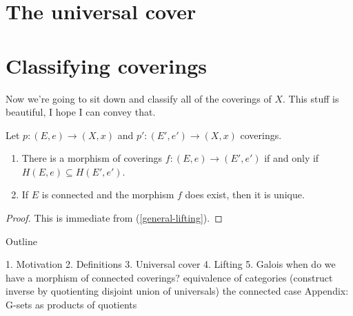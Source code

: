 \section{The universal cover}


\section{Classifying coverings}

Now we're going to sit down and classify all of the coverings of
$X$. This stuff is beautiful, I hope I can convey that.

\begin{lemma}
  Let $p : (E,e) \to (X,x)$ and $p' : (E',e') \to (X,x)$
  coverings.
  \begin{enumerate}
  \item There is a morphism of coverings $f : (E,e) \to (E',e')$
    if and only if $H(E,e) \subseteq H(E',e')$.
  \item If $E$ is connected and the morphism $f$ does exist, then it
    is unique.
  \end{enumerate}
\end{lemma}

\begin{proof}
  This is immediate from (\ref{general-lifting}).
\end{proof}


\nocite{may-concise, munkres}






Outline

1. Motivation
2. Definitions
3. Universal cover
4. Lifting
5. Galois
   when do we have a morphism of connected coverings?
   equivalence of categories (construct inverse by quotienting
   disjoint union of universals)
   the connected case
Appendix: G-sets as products of quotients


